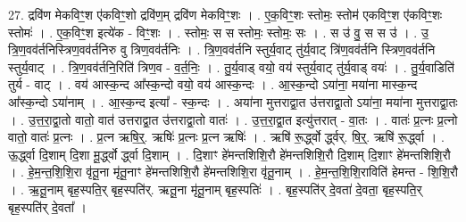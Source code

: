 \documentclass[17pt]{extarticle}
\begin{document}
27. द्रवि॑ण मेकविꣳ॒॒श ए॑कविꣳ॒॒शो द्रवि॑ण॒म् द्रवि॑ण मेकविꣳ॒॒शः । . ए॒क॒विꣳ॒॒शः स्तोमः॒ स्तोम॑ एकविꣳ॒॒श ए॑कविꣳ॒॒शः स्तोमः॑ । . ए॒क॒विꣳ॒॒श इत्ये॑क - विꣳ॒॒शः । . स्तोमः॒ स स स्तोमः॒ स्तोमः॒ सः । . स उ॑ वु॒ स स उ॑ । . उ॒ त्रि॒ण॒वव॑र्तनिस्त्रिण॒वव॑र्तनिरु वु त्रिण॒वव॑र्तनिः । . त्रि॒ण॒वव॑र्तनि स्तुर्य॒वाट् तु॑र्य॒वाट् त्रि॑ण॒वव॑र्तनि स्त्रिण॒वव॑र्तनि स्तुर्य॒वाट् । . त्रि॒ण॒वव॑र्तनि॒रिति॑ त्रिण॒व - व॒र्त॒निः॒ । . तु॒र्य॒वाड् वयो॒ वय॑ स्तुर्य॒वाट् तु॑र्य॒वाड् वयः॑ । . तु॒र्य॒वाडिति॑ तुर्य - वाट् । . वय॑ आस्क॒न्द आ᳚स्क॒न्दो वयो॒ वय॑ आस्क॒न्दः । . आ॒स्क॒न्दो ऽया॑ना॒ मया॑ना मास्क॒न्द आ᳚स्क॒न्दो ऽया॑नाम् । . आ॒स्क॒न्द इत्या᳚ - स्क॒न्दः । . अया॑ना मुत्तराद्वा॒त उ॑त्तराद्वा॒तो ऽया॑ना॒ मया॑ना मुत्तराद्वा॒तः । . उ॒त्त॒रा॒द्वा॒तो वातो॒ वात॑ उत्तराद्वा॒त उ॑त्तराद्वा॒तो वातः॑ । . उ॒त्त॒रा॒द्वा॒त इत्यु॑त्तरात् - वा॒तः । . वातः॑ प्र॒त्नः प्र॒त्नो वातो॒ वातः॑ प्र॒त्नः । . प्र॒त्न ऋषि॒र्॒. ऋषिः॑ प्र॒त्नः प्र॒त्न ऋषिः॑ । . ऋषि॑ रू॒र्द्ध्वो र्द्ध्वर्. षि॒र्॒. ऋषि॑ रू॒र्द्ध्वा । . ऊ॒र्द्ध्वा दि॒शाम् दि॒शा मू॒र्द्ध्वो र्द्ध्वा दि॒शाम् । . दि॒शाꣳ हे॑मन्तशिशि॒रौ हे॑मन्तशिशि॒रौ दि॒शाम् दि॒शाꣳ हे॑मन्तशिशि॒रौ । . हे॒म॒न्त॒शि॒शि॒रा वृ॑तू॒ना मृ॑तू॒नाꣳ हे॑मन्तशिशि॒रौ हे॑मन्तशिशि॒रा वृ॑तू॒नाम् । . हे॒म॒न्त॒शि॒शि॒राविति॑ हेमन्त - शि॒शि॒रौ । . ऋ॒तू॒नाम् बृह॒स्पति॒र् बृह॒स्पति॑र्. ऋतू॒ना मृ॑तू॒नाम् बृह॒स्पतिः॑ । . बृह॒स्पति॑र् दे॒वता॑ दे॒वता॒ बृह॒स्पति॒र् बृह॒स्पति॑र् दे॒वता᳚ । \newline
\end{document}
